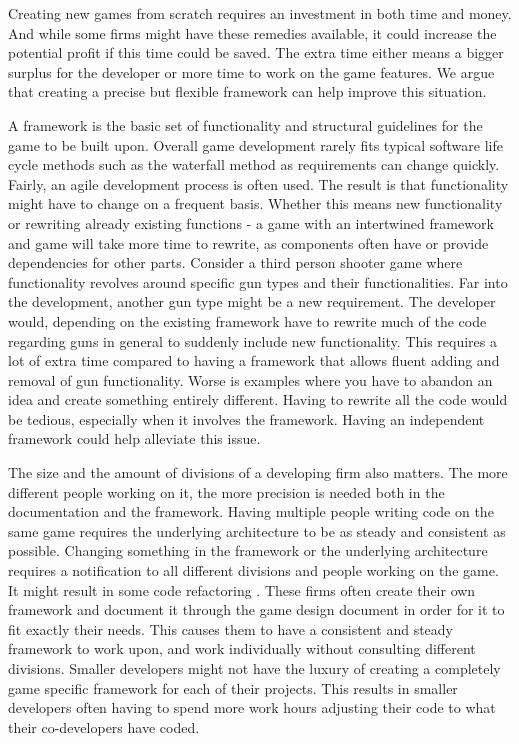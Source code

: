 Creating new games from scratch requires an investment in both time and money. And while some firms might have these remedies available, it could increase the potential profit if this time could be saved. The extra time either means a bigger surplus for the developer or more time to work on the game features. We argue that creating a precise but flexible framework can help improve this situation.

A framework is the basic set of functionality and structural guidelines for the game to be built upon. Overall game development rarely fits typical software life cycle methods such as the waterfall method as requirements can change quickly. Fairly, an agile development process is often used\cite{Gamedevelopment}. The result is that functionality might have to change on a frequent basis. Whether this means new functionality or rewriting already existing functions - a game with an intertwined framework and game will take more time to rewrite, as components often have or provide dependencies for other parts. Consider a third person shooter game where functionality revolves around specific gun types and their functionalities. Far into the development, another gun type might be a new requirement. The developer would, depending on the existing framework have to rewrite much of the code regarding guns in general to suddenly include new functionality. This requires a lot of extra time compared to having a framework that allows fluent adding and removal of gun functionality. Worse is examples where you have to abandon an idea and create something entirely different. Having to rewrite all the code would be tedious, especially when it involves the framework. Having an independent framework could help alleviate this issue.

The size and the amount of divisions of a developing firm also matters. The more different people working on it, the more precision is needed both in the documentation and the framework. Having multiple people writing code on the same game requires the underlying architecture to be as steady and consistent as possible. Changing something in the framework or the underlying architecture requires a notification to all different divisions and people working on the game. It might result in some code refactoring \cite{Gameprod}. These firms often create their own framework and document it through the game design document \cite{Gamedesign} in order for it to fit exactly their needs. This causes them to have a consistent and steady framework to work upon, and work individually without consulting different divisions. Smaller developers might not have the luxury of creating a completely game specific framework for each of their projects. This results in smaller developers often having to spend more work hours adjusting their code to what their co-developers have coded.

